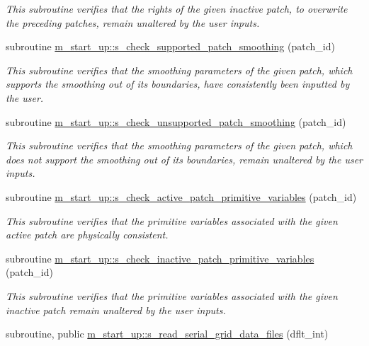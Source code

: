 \begin{DoxyCompactItemize}
\begin{DoxyCompactList}\small\item\em This subroutine verifies that the rights of the given inactive patch, to overwrite the preceding patches, remain unaltered by the user inputs. \end{DoxyCompactList}\item 
subroutine \hyperlink{namespacem__start__up_a06fc233527470088dcf63425fc758b8c}{m\+\_\+start\+\_\+up\+::s\+\_\+check\+\_\+supported\+\_\+patch\+\_\+smoothing} (patch\+\_\+id)
\begin{DoxyCompactList}\small\item\em This subroutine verifies that the smoothing parameters of the given patch, which supports the smoothing out of its boundaries, have consistently been inputted by the user. \end{DoxyCompactList}\item 
subroutine \hyperlink{namespacem__start__up_a9ec1a8955422d87dddd1ad55f99fb9b8}{m\+\_\+start\+\_\+up\+::s\+\_\+check\+\_\+unsupported\+\_\+patch\+\_\+smoothing} (patch\+\_\+id)
\begin{DoxyCompactList}\small\item\em This subroutine verifies that the smoothing parameters of the given patch, which does not support the smoothing out of its boundaries, remain unaltered by the user inputs. \end{DoxyCompactList}\item 
subroutine \hyperlink{namespacem__start__up_a2650f87062992def80eb084ff2c0913b}{m\+\_\+start\+\_\+up\+::s\+\_\+check\+\_\+active\+\_\+patch\+\_\+primitive\+\_\+variables} (patch\+\_\+id)
\begin{DoxyCompactList}\small\item\em This subroutine verifies that the primitive variables associated with the given active patch are physically consistent. \end{DoxyCompactList}\item 
subroutine \hyperlink{namespacem__start__up_a3242a22615c7f69033b53d51df04ad02}{m\+\_\+start\+\_\+up\+::s\+\_\+check\+\_\+inactive\+\_\+patch\+\_\+primitive\+\_\+variables} (patch\+\_\+id)
\begin{DoxyCompactList}\small\item\em This subroutine verifies that the primitive variables associated with the given inactive patch remain unaltered by the user inputs. \end{DoxyCompactList}\item 
subroutine, public \hyperlink{namespacem__start__up_ac2be28e53607458a3860b03446ed6497}{m\+\_\+start\+\_\+up\+::s\+\_\+read\+\_\+serial\+\_\+grid\+\_\+data\+\_\+files} (dflt\+\_\+int)

\end{DoxyCompactItemize}
